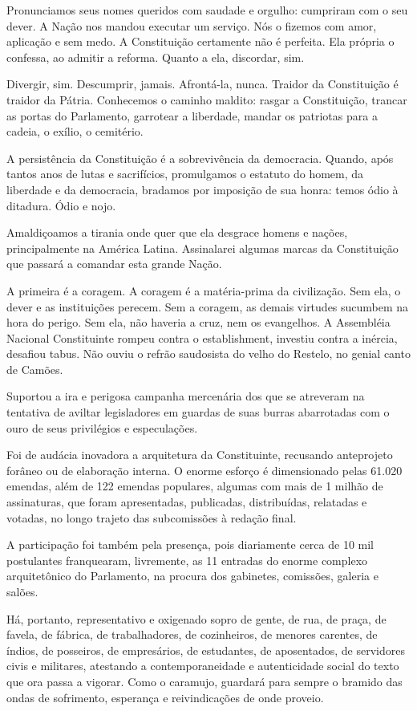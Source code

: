 Pronunciamos seus nomes queridos com saudade e orgulho: cumpriram com o
seu dever. A Nação nos mandou executar um serviço. Nós o fizemos com
amor, aplicação e sem medo. A Constituição certamente não é perfeita.
Ela própria o confessa, ao admitir a reforma. Quanto a ela, discordar,
sim.

Divergir, sim. Descumprir, jamais. Afrontá-la, nunca. Traidor da
Constituição é traidor da Pátria. Conhecemos o caminho maldito: rasgar a
Constituição, trancar as portas do Parlamento, garrotear a liberdade,
mandar os patriotas para a cadeia, o exílio, o cemitério.

A persistência da Constituição é a sobrevivência da democracia. Quando,
após tantos anos de lutas e sacrifícios, promulgamos o estatuto do
homem, da liberdade e da democracia, bradamos por imposição de sua
honra: temos ódio à ditadura. Ódio e nojo.

Amaldiçoamos a tirania onde quer que ela desgrace homens e nações,
principalmente na América Latina. Assinalarei algumas marcas da
Constituição que passará a comandar esta grande Nação.

A primeira é a coragem. A coragem é a matéria-prima da civilização. Sem
ela, o dever e as instituições perecem. Sem a coragem, as demais
virtudes sucumbem na hora do perigo. Sem ela, não haveria a cruz, nem os
evangelhos. A Assembléia Nacional Constituinte rompeu contra o
establishment, investiu contra a inércia, desafiou tabus. Não ouviu o
refrão saudosista do velho do Restelo, no genial canto de Camões.

Suportou a ira e perigosa campanha mercenária dos que se atreveram na
tentativa de aviltar legisladores em guardas de suas burras abarrotadas
com o ouro de seus privilégios e especulações.

Foi de audácia inovadora a arquitetura da Constituinte, recusando
anteprojeto forâneo ou de elaboração interna. O enorme esforço é
dimensionado pelas 61.020 emendas, além de 122 emendas populares,
algumas com mais de 1 milhão de assinaturas, que foram apresentadas,
publicadas, distribuídas, relatadas e votadas, no longo trajeto das
subcomissões à redação final.

A participação foi também pela presença, pois diariamente cerca de 10
mil postulantes franquearam, livremente, as 11 entradas do enorme
complexo arquitetônico do Parlamento, na procura dos gabinetes,
comissões, galeria e salões.

Há, portanto, representativo e oxigenado sopro de gente, de rua, de
praça, de favela, de fábrica, de trabalhadores, de cozinheiros, de
menores carentes, de índios, de posseiros, de empresários, de
estudantes, de aposentados, de servidores civis e militares, atestando a
contemporaneidade e autenticidade social do texto que ora passa a
vigorar. Como o caramujo, guardará para sempre o bramido das ondas de
sofrimento, esperança e reivindicações de onde proveio.


